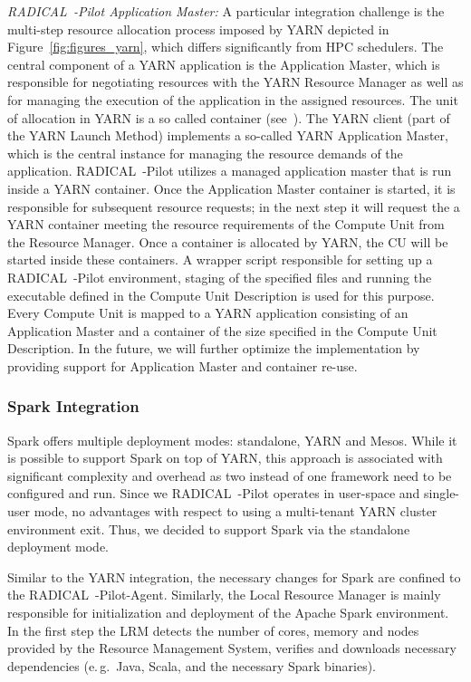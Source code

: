 \emph{RADICAL~-Pilot Application Master:}
A particular integration challenge is the multi-step resource allocation process imposed by YARN depicted in Figure~\ref{fig:figures_yarn}, which differs significantly from HPC schedulers.
The central component of a YARN application is the Application Master, which is responsible for negotiating resources with the YARN Resource Manager as well as for managing the execution of the application in the assigned resources.
The unit of allocation in YARN is a so called container (see~\cite{murthy2014apache}).
The YARN client (part of the YARN Launch Method) implements a so-called YARN Application Master, which is the central instance for managing the resource demands of the application.
RADICAL~-Pilot utilizes a managed application master that is run inside a YARN container.
Once the Application Master container is started, it is responsible for subsequent resource requests; in the next step it will request the a YARN container meeting the resource requirements of the Compute Unit from the Resource Manager.
Once a container is allocated by YARN, the CU will be started inside these containers.
A wrapper script responsible for setting up a RADICAL~-Pilot environment, staging of the specified files and running the executable defined in the Compute Unit Description is used for this purpose.
Every Compute Unit is mapped to a YARN application consisting of an Application Master and a container of the size specified in the Compute Unit Description.
In the future, we will further optimize the implementation by providing support for Application Master and container re-use.


\subsubsection{Spark Integration}
\label{sssec:rp_spark}
Spark offers multiple deployment modes: standalone, YARN and Mesos.
While it is possible to support Spark on top of YARN, this approach is associated with significant complexity and overhead as two instead of one framework need to be configured and run.
Since we RADICAL~-Pilot operates in user-space and single-user mode, no advantages with respect to using a multi-tenant YARN cluster environment exit.
Thus, we decided to support Spark via the standalone deployment mode.

Similar to the YARN integration, the necessary changes for Spark are confined to the RADICAL~-Pilot-Agent.
Similarly, the Local Resource Manager is mainly responsible for initialization and deployment of the Apache Spark environment.
In the first step the LRM detects the number of cores, memory and nodes provided by the Resource Management System, verifies and downloads necessary dependencies (e.\,g.\ Java, Scala, and the necessary Spark binaries).


